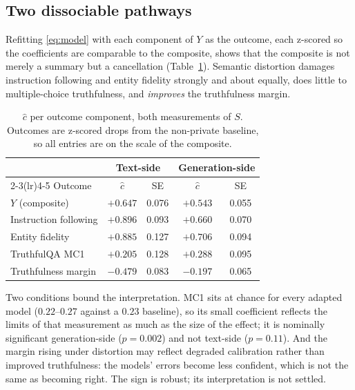 \subsection{\label{apx:components}Two dissociable pathways}
Refitting \eqref{eq:model} with each component of $Y$ as the outcome,
each z-scored so the coefficients are comparable to the composite,
shows that the composite is not merely a summary but a cancellation (Table~\ref{tab:components}).
Semantic distortion damages instruction following and entity fidelity strongly and about equally,
does little to multiple-choice truthfulness,
and \textit{improves} the truthfulness margin.

\begin{table}[t]
  \centering
  \caption{$\hat c$ per outcome component,
  both measurements of $S$. Outcomes are z-scored drops from the non-private baseline,
  so all entries are on the scale of the composite.}
  \label{tab:components}
  \begin{tabular}{lcccc}
    \toprule
    & \multicolumn{2}{c}{Text-side} & \multicolumn{2}{c}{Generation-side} \\
    \cmidrule(lr){2-3}\cmidrule(lr){4-5}
    Outcome & $\hat c$ & SE & $\hat c$ & SE \\
    \midrule
    $Y$ (composite)          & $+0.647$ & 0.076 & $+0.543$ & 0.055 \\
    Instruction following    & $+0.896$ & 0.093 & $+0.660$ & 0.070 \\
    Entity fidelity          & $+0.885$ & 0.127 & $+0.706$ & 0.094 \\
    TruthfulQA MC1           & $+0.205$ & 0.128 & $+0.288$ & 0.095 \\
    Truthfulness margin      & $-0.479$ & 0.083 & $-0.197$ & 0.065 \\
    \bottomrule
  \end{tabular}
\end{table}

Two conditions bound the interpretation.
MC1 sits at chance for every adapted model ($0.22$--$0.27$ against a $0.23$ baseline),
so its small coefficient reflects the limits of that measurement as much as the size of the effect;
it is nominally significant generation-side ($p = 0.002$) and not text-side ($p = 0.11$).
And the margin rising under distortion may reflect degraded calibration rather than improved truthfulness:
the models' errors become less confident,
which is not the same as becoming right.
The sign is robust;
its interpretation is not settled.

